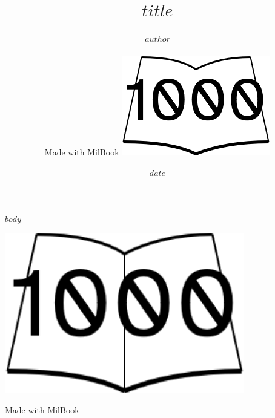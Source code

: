 \documentclass[
]{book}
\title{$title$}
\author{$author$ \\ \\{Made with MilBook \includegraphics[height=1.5ex]{images/sample_image.png}}}
\date{$date$}
\begin{document}
\maketitle


\tableofcontents


$body$

\newpage
\begin{center}
\includegraphics[height=7cm]{images/sample_image.png}

Made with MilBook
\end{center}
\end{document}
